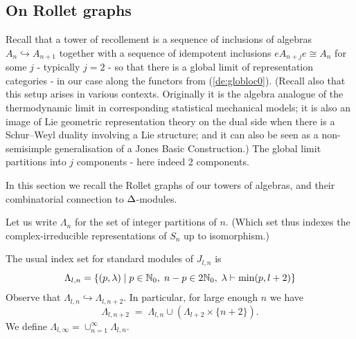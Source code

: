 


\subsection{On Rollet graphs  }

\newcommand{\Roll}{{\mathcal{R}}}  %
Recall that a tower of recollement \cite{ToR} 
is a sequence of 
inclusions of algebras $A_n \hookrightarrow A_{n+1}$ together with a sequence of idempotent inclusions $e A_{n+j} e \cong A_n$ for some $j$ - typically $j=2$ - so that there is a  global limit of representation categories - 
in our case 
along the functors from (\ref{de:globloc0}). (Recall also that this setup arises in various contexts. Originally it is the algebra analogue of the thermodynamic limit in corresponding statistical mechanical models; it is also an image of Lie geometric representation theory on the dual side when there is a Schur--Weyl duality involving a Lie structure; and it can also be seen as a non-semisimple generalisation of a Jones Basic Construction.) 
The global limit partitions into $j$ components - here indeed 2 components.  

In this section we recall the Rollet graphs of our towers of algebras, and their combinatorial connection 
to $\Delta$-modules. 

\mdef   \label{de:Lambdan}
Let us write $\Lambda_n$ for the set of integer partitions of $n$. 
(Which set thus indexes the complex-irreducible representations of $S_n$ up to isomorphism.) 


\newcommand{\Lambdax}{\ppm{\Lambda}} %

\mdef   \label{def:indexset}
The usual \cite{KadarYu} index set for standard modules of $J_{l,n}$ is 
\[
\Lambda_{l,n} = \{  ( p, \l)\; | \; p \in \N_0, \; 
n-p \in 2\N_0 ,  %
\; \l\vdash   \min(p,l+2) \}
\]
Observe that $\Lambda_{l,n} \hookrightarrow \Lambda_{l,n+2}$. 
In particular, for large enough $n$ we have 
$$
\Lambda_{l,n+2} \; = \; \Lambda_{l,n} \cup \left(\Lambda_{l+2}\times \{n+2\}\right)  .
$$
We define $\Lambda_{l,\infty}=\cup_{n=1}^\infty \Lambda_{l,n}$. %

